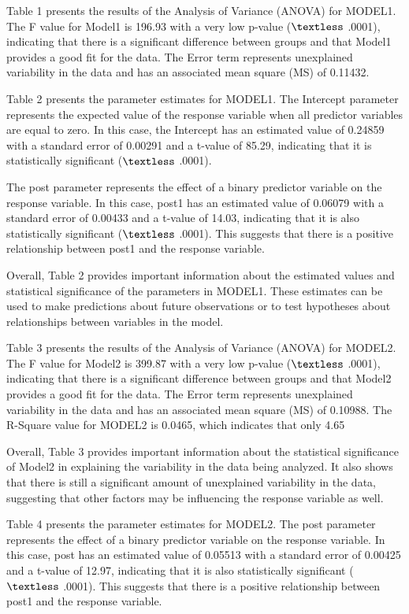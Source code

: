 \documentclass[12pt,english]{article}
\begin{document}
Table 1 presents the results of the Analysis of Variance (ANOVA) for MODEL1. The F value for Model1 is 196.93 with a very low p-value ($\textless$ .0001), indicating that there is a significant difference between groups and that Model1 provides a good fit for the data. The Error term represents unexplained variability in the data and has an associated mean square (MS) of 0.11432.

Table 2 presents the parameter estimates for MODEL1. The Intercept parameter represents the expected value of the response variable when all predictor variables are equal to zero. In this case, the Intercept has an estimated value of 0.24859 with a standard error of 0.00291 and a t-value of 85.29, indicating that it is statistically significant ($\textless$ .0001).

The post parameter represents the effect of a binary predictor variable on the response variable. In this case, post1 has an estimated value of 0.06079 with a standard error of 0.00433 and a t-value of 14.03, indicating that it is also statistically significant ($\textless$ .0001). This suggests that there is a positive relationship between post1 and the response variable.

Overall, Table 2 provides important information about the estimated values and statistical significance of the parameters in MODEL1. These estimates can be used to make predictions about future observations or to test hypotheses about relationships between variables in the model.

Table 3 presents the results of the Analysis of Variance (ANOVA) for MODEL2. The F value for Model2 is 399.87 with a very low p-value ($\textless$ .0001), indicating that there is a significant difference between groups and that Model2 provides a good fit for the data. The Error term represents unexplained variability in the data and has an associated mean square (MS) of 0.10988. The R-Square value for MODEL2 is 0.0465, which indicates that only 4.65%

Overall, Table 3 provides important information about the statistical significance of Model2 in explaining the variability in the data being analyzed. It also shows that there is still a significant amount of unexplained variability in the data, suggesting that other factors may be influencing the response variable as well.

Table 4 presents the parameter estimates for MODEL2. The post parameter represents the effect of a binary predictor variable on the response variable. In this case, post has an estimated value of 0.05513 with a standard error of 0.00425 and a t-value of 12.97, indicating that it is also statistically significant ($\textless$ .0001). This suggests that there is a positive relationship between post1 and the response variable.
\end{document}
